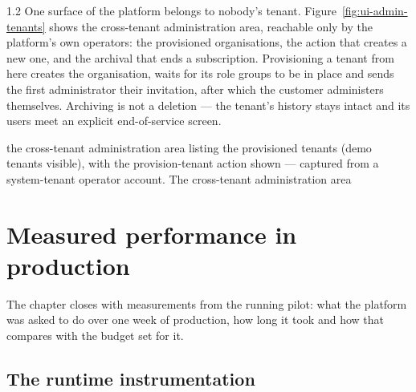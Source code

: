 \begin{spacing}{1.2}
One surface of the platform belongs to nobody's tenant.
Figure~\ref{fig:ui-admin-tenants} shows the cross-tenant administration
area, reachable only by the platform's own operators: the provisioned
organisations, the action that creates a new one, and the archival that
ends a subscription. Provisioning a tenant from here creates the
organisation, waits for its role groups to be in place and sends the
first administrator their invitation, after which the customer
administers themselves. Archiving is not a deletion --- the tenant's
history stays intact and its users meet an explicit end-of-service
screen.

  {the cross-tenant administration area listing the provisioned tenants
   (demo tenants visible), with the provision-tenant action shown ---
   captured from a system-tenant operator account.}
  {The cross-tenant administration area}
\vspace{1cm}

\section{Measured performance in production}
\label{sec:runtime-perf}

The chapter closes with measurements from the running pilot: what the
platform was asked to do over one week of production, how long it took
and how that compares with the budget set for it.

\subsection{The runtime instrumentation}
\label{sec:runtime-instrumentation}


\end{spacing}

